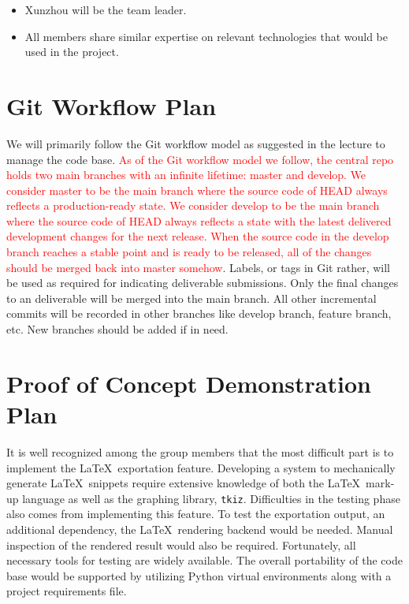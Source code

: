 \documentclass{article}
\begin{document}
\begin{itemize}
\item Xunzhou will be the team leader.
\item All members share similar expertise on relevant technologies that would be
  used in the project.
\end{itemize}

\section{Git Workflow Plan}

We will primarily follow the Git workflow model as suggested in the lecture to
manage the code base. \textcolor{red}{As of the Git workflow model we follow,
  the central repo holds two main branches with an infinite lifetime: master and
develop. We consider master to be the main branch where the source code of HEAD
always reflects a production-ready state. We consider develop to be the main
branch where the source code of HEAD always reflects a state with the latest
delivered development changes for the next release. When the source code in the
develop branch reaches a stable point and is ready to be released, all of the
changes should be merged back into master somehow}. Labels, or tags in Git rather, will be used as required
for indicating deliverable submissions. Only the final changes to an deliverable
will be merged into the main branch. All other incremental commits will be
recorded in other branches like develop branch, feature branch, etc. New
branches should be added if in need.

\section{Proof of Concept Demonstration Plan}

It is well recognized among the group members that the most difficult part is to
implement the \LaTeX\ exportation feature. Developing a system to mechanically
generate \LaTeX\ snippets require extensive knowledge of both the \LaTeX\
mark-up language as well as the graphing library, \verb|tkiz|. Difficulties in
the testing phase also comes from implementing this feature. To test the
exportation output, an additional dependency, the \LaTeX\ rendering backend
would be needed. Manual inspection of the rendered result would also be
required. Fortunately, all necessary tools for testing are widely available. The
overall portability of the code base would be supported by utilizing Python
virtual environments along with a project requirements file.
\end{document}
